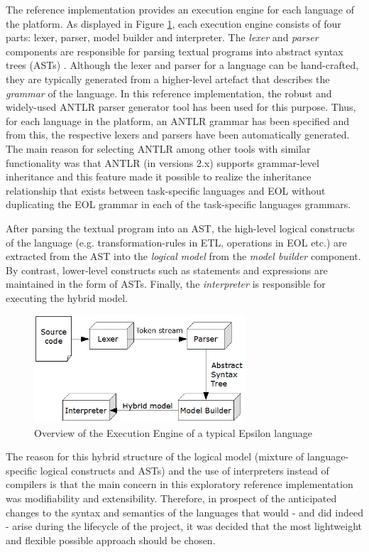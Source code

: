 The reference implementation provides an execution engine for each language of the platform. As displayed in Figure \ref{fig:InterpreterArchitecture}, each execution engine consists of four parts: lexer, parser, model builder and interpreter. The \emph{lexer} and \emph{parser} components are responsible for parsing textual programs into abstract syntax trees (ASTs) \cite{DragonBook}. Although the lexer and parser for a language can be hand-crafted, they are typically generated from a higher-level artefact that describes the \emph{grammar} of the language. In this reference implementation, the robust and widely-used ANTLR \cite{ANTLR} parser generator tool has been used for this purpose. Thus, for each language in the platform, an ANTLR grammar has been specified and from this, the respective lexers and parsers have been automatically generated. The main reason for selecting ANTLR among other tools with similar functionality was that ANTLR (in versions 2.x) supports grammar-level inheritance and this feature made it possible to realize the inheritance relationship that exists between task-specific languages and EOL without duplicating the EOL grammar in each of the task-specific languages grammars.

After parsing the textual program into an AST, the high-level logical constructs of the language (e.g. transformation-rules in ETL, operations in EOL etc.) are extracted from the AST into the \emph{logical model} from the \emph{model builder} component. By contrast, lower-level constructs such as statements and expressions are maintained in the form of ASTs. Finally, the \emph{interpreter} is responsible for executing the hybrid model.

\begin{figure}
	\centering
		\includegraphics[width=0.7\textwidth]{images/InterpreterArchitecture.png}
	\caption{Overview of the Execution Engine of a typical Epsilon language}
	\label{fig:InterpreterArchitecture}
\end{figure}

The reason for this hybrid structure of the logical model (mixture of language-specific logical constructs and ASTs) and the use of interpreters instead of compilers is that the main concern in this exploratory reference implementation was modifiability and extensibility. Therefore, in prospect of the anticipated changes to the syntax and semantics of the languages that would - and did indeed - arise during the lifecycle of the project, it was decided that the most lightweight and flexible possible approach should be chosen.

